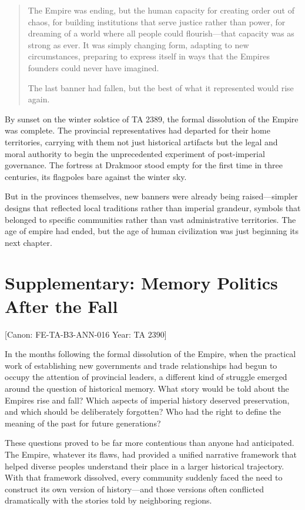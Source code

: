 \begin{quote}
The Empire was ending, but the human capacity for creating order out of
chaos, for building institutions that serve justice rather than power,
for dreaming of a world where all people could flourish---that capacity
was as strong as ever. It was simply changing form, adapting to new
circumstances, preparing to express itself in ways that the
Empire\textquotesingle s founders could never have imagined.

The last banner had fallen, but the best of what it represented would
rise again.
\end{quote}

By sunset on the winter solstice of TA 2389, the formal dissolution of
the Empire was complete. The provincial representatives had departed for
their home territories, carrying with them not just historical artifacts
but the legal and moral authority to begin the unprecedented experiment
of post-imperial governance. The fortress at Drakmoor stood empty for
the first time in three centuries, its flagpoles bare against the winter
sky.

But in the provinces themselves, new banners were already being
raised---simpler designs that reflected local traditions rather than
imperial grandeur, symbols that belonged to specific communities rather
than vast administrative territories. The age of empire had ended, but
the age of human civilization was just beginning its next chapter.

\section{Supplementary: Memory Politics After the
Fall}\label{supplementary-memory-politics-after-the-fall}

{[}Canon: FE-TA-B3-ANN-016 \textbar{} Year: TA 2390{]}

In the months following the formal dissolution of the Empire, when the
practical work of establishing new governments and trade relationships
had begun to occupy the attention of provincial leaders, a different
kind of struggle emerged around the question of historical memory. What
story would be told about the Empire\textquotesingle s rise and fall?
Which aspects of imperial history deserved preservation, and which
should be deliberately forgotten? Who had the right to define the
meaning of the past for future generations?

These questions proved to be far more contentious than anyone had
anticipated. The Empire, whatever its flaws, had provided a unified
narrative framework that helped diverse peoples understand their place
in a larger historical trajectory. With that framework dissolved, every
community suddenly faced the need to construct its own version of
history---and those versions often conflicted dramatically with the
stories told by neighboring regions.

